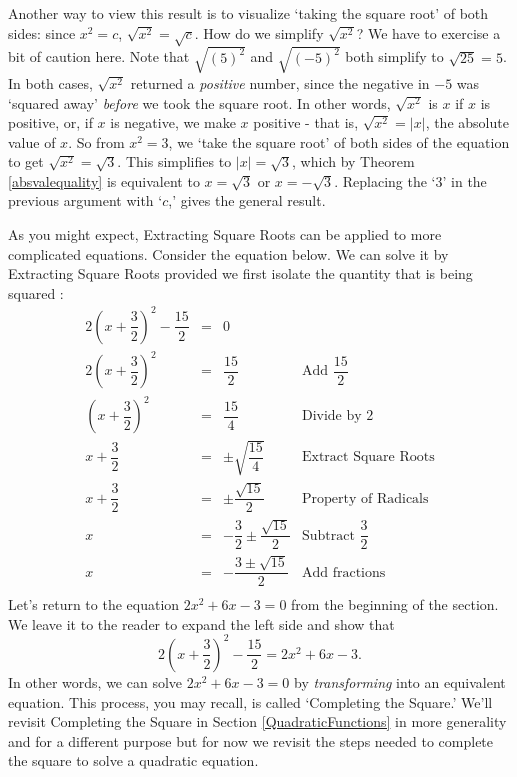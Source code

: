 \documentclass{ximera}
\begin{document}
{{\smallskip

Another way to view this result is to visualize  `taking the square root' of both sides:   since $x^2 = c$,  $\sqrt{x^2} = \sqrt{c}$.  How do we simplify $\sqrt{x^2}$? We have to exercise a bit of caution here.  Note that $\sqrt{(5)^2}$ and $\sqrt{(-5)^2}$ both simplify to  $\sqrt{25} = 5$.  In both cases, $\sqrt{x^2}$ returned a \textit{positive} number, since the negative in $-5$ was `squared away' \textit{before} we took the square root.  In other words, $\sqrt{x^2}$ is $x$ if $x$ is positive, or, if $x$ is negative, we make $x$ positive - that is, $\sqrt{x^2} = |x|$, the absolute value of $x$.  So from $x^2 = 3$, we `take the square root' of both sides of the equation to get $\sqrt{x^2} = \sqrt{3}$.  This simplifies to $|x| = \sqrt{3}$, which by Theorem \ref{absvalequality} is equivalent to $x = \sqrt{3}$ or $x = -\sqrt{3}$.  Replacing the `$3$' in the previous argument with `$c$,' gives the general result.

\smallskip

As you might expect, Extracting Square Roots can be applied to more complicated equations.  Consider the equation below.  We can solve it by Extracting Square Roots provided we first isolate the quantity that is being squared :\[ \begin{array}{rclr}

2\left(x + \dfrac{3}{2}\right)^2 - \dfrac{15}{2} & = & 0 & \\ [8pt]
2\left(x + \dfrac{3}{2}\right)^2 & = & \dfrac{15}{2} & \text{Add $\dfrac{15}{2}$} \\
\left(x + \dfrac{3}{2}\right)^2 & = & \dfrac{15}{4} & \text{Divide by $2$} \\
x + \dfrac{3}{2} & = & \pm \sqrt{\dfrac{15}{4}} & \text{Extract Square Roots} \\ [8pt]
x + \dfrac{3}{2} & = & \pm \dfrac{\sqrt{15}}{2} & \text{Property of Radicals} \\ [5pt]
x & = & -\dfrac{3}{2} \pm \dfrac{\sqrt{15}}{2}  & \text{Subtract $\dfrac{3}{2}$} \\ [8pt]
x & = & -\dfrac{3 \pm \sqrt{15}}{2}  & \text{Add fractions} \\

\end{array} \] Let's return to the equation $2x^2 + 6x - 3 = 0$ from the beginning of the section.  We leave it to the reader to expand the left side and show that \[2\left(x + \dfrac{3}{2}\right)^2 - \dfrac{15}{2} =  2x^2 + 6x - 3. \] In other words, we can solve $2x^2 + 6x - 3 = 0$  by \textit{transforming} into an equivalent equation. This process, you may recall, is called `Completing the Square.'  We'll revisit Completing the Square in Section \ref{QuadraticFunctions} in more generality and for a different purpose but for now we revisit the steps needed to complete the square to solve a quadratic equation.

}}
\end{document}
